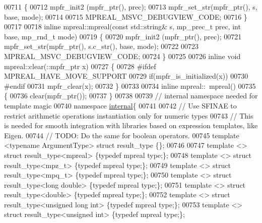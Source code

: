 \begin{DoxyCode}
00711 \{
00712     mpfr\_init2  (mpfr\_ptr(), prec);
00713     mpfr\_set\_str(mpfr\_ptr(), s, base, mode);
00714 
00715     MPREAL\_MSVC\_DEBUGVIEW\_CODE;
00716 \}
00717 
00718 \textcolor{keyword}{inline} mpreal::mpreal(\textcolor{keyword}{const} std::string& s, mp\_prec\_t prec, \textcolor{keywordtype}{int} base, mp\_rnd\_t mode)
00719 \{
00720     mpfr\_init2  (mpfr\_ptr(), prec);
00721     mpfr\_set\_str(mpfr\_ptr(), s.c\_str(), base, mode);
00722 
00723     MPREAL\_MSVC\_DEBUGVIEW\_CODE;
00724 \}
00725 
00726 \textcolor{keyword}{inline} \textcolor{keywordtype}{void} mpreal::clear(::mpfr\_ptr x)
00727 \{
00728 \textcolor{preprocessor}{#ifdef MPREAL\_HAVE\_MOVE\_SUPPORT}
00729     \textcolor{keywordflow}{if}(mpfr\_is\_initialized(x))
00730 \textcolor{preprocessor}{#endif}
00731     mpfr\_clear(x);
00732 \}
00733 
00734 \textcolor{keyword}{inline} mpreal::~mpreal()
00735 \{
00736     clear(mpfr\_ptr());
00737 \}
00738 
00739 \textcolor{comment}{// internal namespace needed for template magic}
00740 \textcolor{keyword}{namespace }\hyperlink{namespaceinternal}{internal}\{
00741 
00742     \textcolor{comment}{// Use SFINAE to restrict arithmetic operations instantiation only for numeric types}
00743     \textcolor{comment}{// This is needed for smooth integration with libraries based on expression templates, like Eigen.}
00744     \textcolor{comment}{// TODO: Do the same for boolean operators.}
00745     \textcolor{keyword}{template} <\textcolor{keyword}{typename} ArgumentType> \textcolor{keyword}{struct }result\_type \{\};
00746 
00747     \textcolor{keyword}{template} <> \textcolor{keyword}{struct }result\_type<mpreal>              \{\textcolor{keyword}{typedef} mpreal type;\};
00748     \textcolor{keyword}{template} <> \textcolor{keyword}{struct }result\_type<mpz\_t>               \{\textcolor{keyword}{typedef} mpreal type;\};
00749     \textcolor{keyword}{template} <> \textcolor{keyword}{struct }result\_type<mpq\_t>               \{\textcolor{keyword}{typedef} mpreal type;\};
00750     \textcolor{keyword}{template} <> \textcolor{keyword}{struct }result\_type<long double>         \{\textcolor{keyword}{typedef} mpreal type;\};
00751     \textcolor{keyword}{template} <> \textcolor{keyword}{struct }result\_type<double>              \{\textcolor{keyword}{typedef} mpreal type;\};
00752     \textcolor{keyword}{template} <> \textcolor{keyword}{struct }result\_type<unsigned long int>   \{\textcolor{keyword}{typedef} mpreal type;\};
00753     \textcolor{keyword}{template} <> \textcolor{keyword}{struct }result\_type<unsigned int>        \{\textcolor{keyword}{typedef} mpreal type;\};

\end{DoxyCode}
